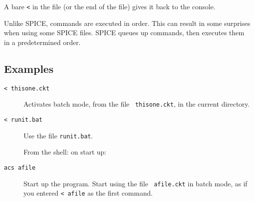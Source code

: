 A bare {\tt <} in the file (or the end of the file) gives it back to the
console.

Unlike SPICE, commands are executed in order.  This can result in some
surprises when using some SPICE files.  SPICE queues up commands, then
executes them in a predetermined order.
\subsection{Examples}

\begin{description}

\item[{\tt < thisone.ckt}] Activates batch mode, from the file {\tt
thisone.ckt}, in the current directory.

\item[{\tt < runit.bat}] Use the file {\tt runit.bat}.


From the shell: on start up:

\item[{\tt acs afile}] Start up the program.  Start using the file {\tt
afile.ckt} in batch mode, as if you entered {\tt < afile} as the first
command.

\end{description}
